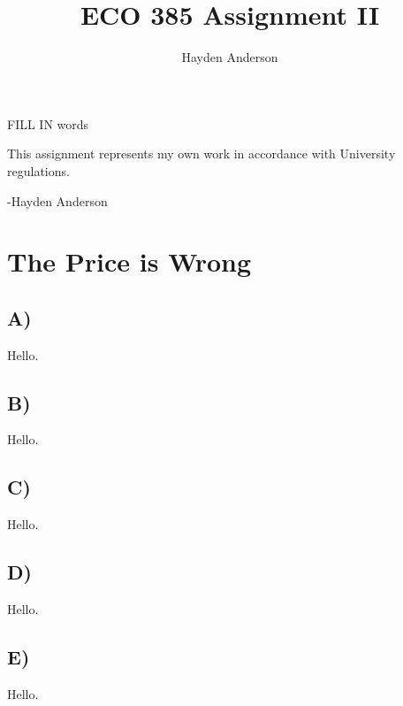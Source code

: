 \documentclass[a4paper]{article}
\title{ECO 385 Assignment II}
\author{Hayden Anderson}
\begin{document}
\maketitle

\doublespacing

\vspace{10mm}
\begin{center}
FILL IN words
\end{center}

\vfill
\begin{flushright}
This assignment represents my own work in accordance with University regulations.

-Hayden Anderson
\end{flushright}

\newpage


\section{The Price is Wrong}

\subsection*{A)}

Hello.

\subsection*{B)}

Hello.

\subsection*{C)}

Hello.

\subsection*{D)}

Hello.

\subsection*{E)}

Hello.

\end{document}
